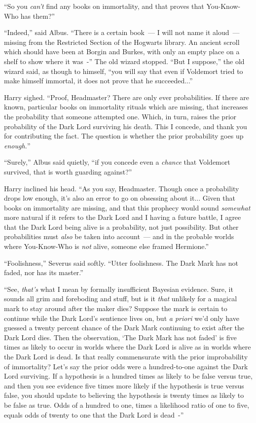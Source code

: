 ``So you \emph{can't} find any books on immortality, and that proves that You-Know-Who has them?''

``Indeed,'' said Albus. ``There is a certain book~--- I will not name it aloud~--- missing from the Restricted Section of the Hogwarts library. An ancient scroll which should have been at Borgin and Burkes, with only an empty place on a shelf to show where it was~-'' The old wizard stopped. ``But I suppose,'' the old wizard said, as though to himself, ``you will say that even if Voldemort tried to make himself immortal, it does not prove that he succeeded...''

Harry sighed. ``Proof, Headmaster? There are only ever probabilities. If there are known, particular books on immortality rituals which are missing, that increases the probability that someone attempted one. Which, in turn, raises the prior probability of the Dark Lord surviving his death. This I concede, and thank you for contributing the fact. The question is whether the prior probability goes up \emph{enough.}''

``Surely,'' Albus said quietly, ``if you concede even a \emph{chance} that Voldemort survived, that is worth guarding against?''

Harry inclined his head. ``As you say, Headmaster. Though once a probability drops low enough, it's also an error to go on obsessing about it... Given that books on immortality are missing, and that this prophecy would sound \emph{somewhat} more natural if it refers to the Dark Lord and I having a future battle, I agree that the Dark Lord being alive is a probability, not just possibility. But other probabilities must \emph{also} be taken into account~--- and in the probable worlds where You-Know-Who is \emph{not} alive, someone else framed Hermione.''

``Foolishness,'' Severus said softly. ``Utter foolishness. The Dark Mark has not faded, nor has its master.''

``See, \emph{that's} what I mean by formally insufficient Bayesian evidence. Sure, it sounds all grim and foreboding and stuff, but is it \emph{that} unlikely for a magical mark to stay around after the maker dies? Suppose the mark is certain to continue while the Dark Lord's sentience lives on, but \emph{a priori} we'd only have guessed a twenty percent chance of the Dark Mark continuing to exist after the Dark Lord dies. Then the observation, `The Dark Mark has not faded' is five times as likely to occur in worlds where the Dark Lord is alive as in worlds where the Dark Lord is dead. Is that really commensurate with the prior improbability of immortality? Let's say the prior odds were a hundred-to-one against the Dark Lord surviving. If a hypothesis is a hundred times as likely to be false versus true, and then you see evidence five times more likely if the hypothesis is true versus false, you should update to believing the hypothesis is twenty times as likely to be false as true. Odds of a hundred to one, times a likelihood ratio of one to five, equals odds of twenty to one that the Dark Lord is dead~-''

